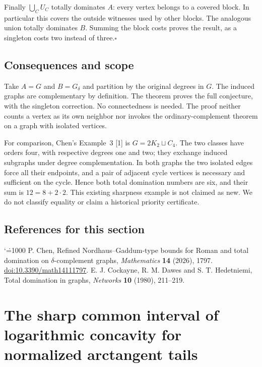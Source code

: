 \documentclass[11pt,a4paper]{article}
\makeatletter
\numberwithin{equation}{section}
\theoremstyle{definition}
\theoremstyle{remark}
\renewenvironment{thebibliography}[1]
 {\subsection*{References for this section}\small
  \list{\@biblabel{\@arabic\c@enumiv}}
       {\settowidth\labelwidth{\@biblabel{#1}}\leftmargin\labelwidth
        \advance\leftmargin\labelsep\@openbib@code
        \usecounter{enumiv}\let\p@enumiv\@empty
        \renewcommand\theenumiv{\@arabic\c@enumiv}}
  \sloppy\clubpenalty4000\widowpenalty4000\sfcode`\.=1000\relax}
 {\def\@noitemerr{\@latex@warning{Empty bibliography}}\endlist}
\makeatother
\begin{document}
Finally $\bigcup_C U_C$ totally dominates $A$: every vertex belongs
to a covered block. In particular this covers the outside witnesses
used by other blocks. The analogous union totally dominates $B$.
Summing the block costs proves the result, as a singleton costs two
instead of three.\hfill$\square$

\subsection*{Consequences and scope}
Take $A=G$ and $B=G_\delta$ and partition by the original degrees in $G$.
The induced graphs are complementary by definition. The theorem proves
the full conjecture, with the singleton correction. No connectedness is
needed. The proof neither counts a vertex as its own neighbor nor
invokes the ordinary-complement theorem on a graph with isolated vertices.

For comparison, Chen's Example~3 [1] is $G=2K_2\sqcup C_4$. The two
classes have orders four, with respective degrees one and two; they
exchange induced subgraphs under degree complementation. In both
graphs the two isolated edges force all their endpoints, and a pair
of adjacent cycle vertices is necessary and sufficient on the cycle.
Hence both total domination numbers are six, and their sum is
$12=8+2\cdot2$. This existing sharpness example is not claimed as new.
We do not classify equality or claim a historical priority certificate.

\begin{thebibliography}{9}
 P. Chen, Refined Nordhaus--Gaddum-type bounds for Roman
and total domination on $\delta$-complement graphs, \emph{Mathematics}
\textbf{14} (2026), 1797.
\href{https://doi.org/10.3390/math14111797}{doi:10.3390/math14111797}.
 E. J. Cockayne, R. M. Dawes and S. T. Hedetniemi,
Total domination in graphs, \emph{Networks} \textbf{10} (1980), 211--219.
\end{thebibliography}

\par\endgroup

\begingroup
\newcommand{\dd}{\,\mathrm d}
\section{\texorpdfstring{The sharp common interval of logarithmic concavity for normalized arctangent tails}{The sharp common interval of logarithmic concavity for normalized arctangent tails}}\label{section:r30heisei}
\par\medskip
\end{document}
